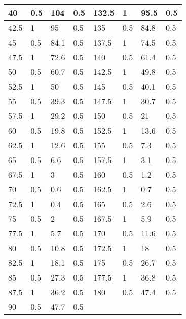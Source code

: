 \begin{table}[]
\begin{tabular}{|l|l|l|l||l|l|l|l|}
40    & 0.5         & 104     & 0.5     & 132.5 & 1           & 95.5    & 0.5     \\ \hline
42.5  & 1           & 95      & 0.5     & 135   & 0.5         & 84.8    & 0.5     \\ \hline
45    & 0.5         & 84.1    & 0.5     & 137.5 & 1           & 74.5    & 0.5     \\ \hline
47.5  & 1           & 72.6    & 0.5     & 140   & 0.5         & 61.4    & 0.5     \\ \hline
50    & 0.5         & 60.7    & 0.5     & 142.5 & 1           & 49.8    & 0.5     \\ \hline
52.5  & 1           & 50      & 0.5     & 145   & 0.5         & 40.1    & 0.5     \\ \hline
55    & 0.5         & 39.3    & 0.5     & 147.5 & 1           & 30.7    & 0.5     \\ \hline
57.5  & 1           & 29.2    & 0.5     & 150   & 0.5         & 21      & 0.5     \\ \hline
60    & 0.5         & 19.8    & 0.5     & 152.5 & 1           & 13.6    & 0.5     \\ \hline
62.5  & 1           & 12.6    & 0.5     & 155   & 0.5         & 7.3     & 0.5     \\ \hline
65    & 0.5         & 6.6     & 0.5     & 157.5 & 1           & 3.1     & 0.5     \\ \hline
67.5  & 1           & 3       & 0.5     & 160   & 0.5         & 1.2     & 0.5     \\ \hline
70    & 0.5         & 0.6     & 0.5     & 162.5 & 1           & 0.7     & 0.5     \\ \hline
72.5  & 1           & 0.4     & 0.5     & 165   & 0.5         & 2.6     & 0.5     \\ \hline
75    & 0.5         & 2       & 0.5     & 167.5 & 1           & 5.9     & 0.5     \\ \hline
77.5  & 1           & 5.7     & 0.5     & 170   & 0.5         & 11.6    & 0.5     \\ \hline
80    & 0.5         & 10.8    & 0.5     & 172.5 & 1           & 18      & 0.5     \\ \hline
82.5  & 1           & 18.1    & 0.5     & 175   & 0.5         & 26.7    & 0.5     \\ \hline
85    & 0.5         & 27.3    & 0.5     & 177.5 & 1           & 36.8    & 0.5     \\ \hline
87.5  & 1           & 36.2    & 0.5     & 180   & 0.5         & 47.4    & 0.5     \\ \hline
90    & 0.5         & 47.7    & 0.5     &       &             &         &         \\ \hline
\end{tabular}
\end{table}

